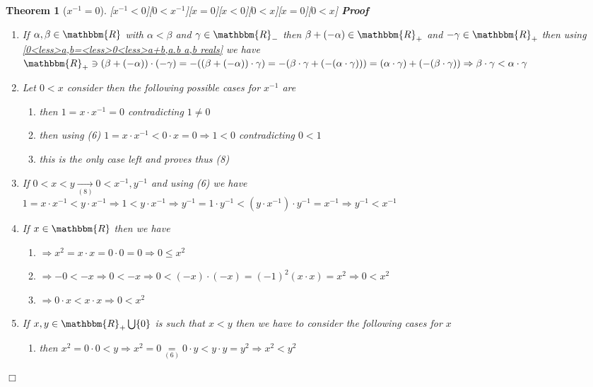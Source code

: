 \documentclass{book}
\newcommand{\Rightarrowlim}{\mathop{\rightarrow}\limits}
\newcommand{\equallim}{\mathop{=}\limits}
\newcommand{\um}{-}
\newcommand{\upl}{+}
\newenvironment{proof}{\noindent\textbf{Proof\ }}{\hspace*{\fill}$\Box$\medskip}
\newtheorem{theorem}{Theorem}
\begin{document}
{{\begin{theorem}[$x^{- 1} = 0$][$x^{- 1} < 0$][$0 < x^{- 1}$][$x = 0$][$x <
0$][$0 < x$][$x = 0$][$0 < x$]
\begin{proof}
\begin{enumerate}
      \item If $\alpha, \beta \in \mathbbm{R}$ with $\alpha < \beta$ and
      $\gamma \in \mathbbm{R}_-$ then $\beta \upl (- \alpha) \in
      \mathbbm{R}_+$ and $- \gamma \in \mathbbm{R}_+$ then using
      \ref{0<less>a,b=<less>0<less>a+b,a.b a,b reals} we have $\mathbbm{R}_+
      \ni (\beta \upl (\um \alpha)) \cdot (\um \gamma) = \um ((\beta \upl (-
      \alpha)) \cdot \gamma) = - (\beta \cdot \gamma \upl (- (\alpha \cdot
      \gamma))) = (\alpha \cdot \gamma) \upl (- (\beta \cdot \gamma))
      \Rightarrow \beta \cdot \gamma < \alpha \cdot \gamma$
      
      \item Let $0 < x$ consider then the following possible cases for $x^{-
      1}$ are
      \begin{enumerate}
        \item then $1 = x \cdot x^{- 1} = 0$ contradicting $1 \neq 0$
        
        \item then using (6) $1 = x \cdot x^{- 1} < 0 \cdot x = 0 \Rightarrow
        1 < 0$ contradicting $0 < 1$
        
        \item this is the only case left and proves thus (8)
      \end{enumerate}
      \item If $0 < x < y \Rightarrowlim_{(8)} 0 < x^{- 1}, y^{- 1}$ and using
      (6) we have $1 = x \cdot x^{- 1} < y \cdot x^{- 1} \Rightarrow 1 < y
      \cdot x^{- 1} \Rightarrow y^{- 1} = 1 \cdot y^{- 1} < (y \cdot x^{- 1})
      \cdot y^{- 1} = x^{- 1} \Rightarrow y^{- 1} < x^{- 1}$
      
      \item If $x \in \mathbbm{R}$ then we have
      \begin{enumerate}
        \item $\Rightarrow x^2 = x \cdot x = 0 \cdot 0 = 0 \Rightarrow 0
        \leqslant x^2$
        
        \item $\Rightarrow - 0 < - x \Rightarrow 0 < - x \Rightarrow 0 < (- x)
        \cdot (- x) = (- 1)^2 (x \cdot x) = x^2 \Rightarrow 0 < x^2$
        
        \item $\Rightarrow 0 \cdot x < x \cdot x \Rightarrow 0 < x^2$
      \end{enumerate}
      \item If $x, y \in \mathbbm{R}_+ \bigcup \{ 0 \}$ is such that $x < y$
      then we have to consider the following cases for $x$
      \begin{enumerate}
        \item then $x^2 = 0 \cdot 0 < y \Rightarrow x^2 = 0 \equallim_{(6)} 0
        \cdot y < y \cdot y = y^2 \Rightarrow x^2 < y^2$
        

\end{enumerate}
\end{enumerate}
\end{proof}
\end{theorem}}}
\end{document}
